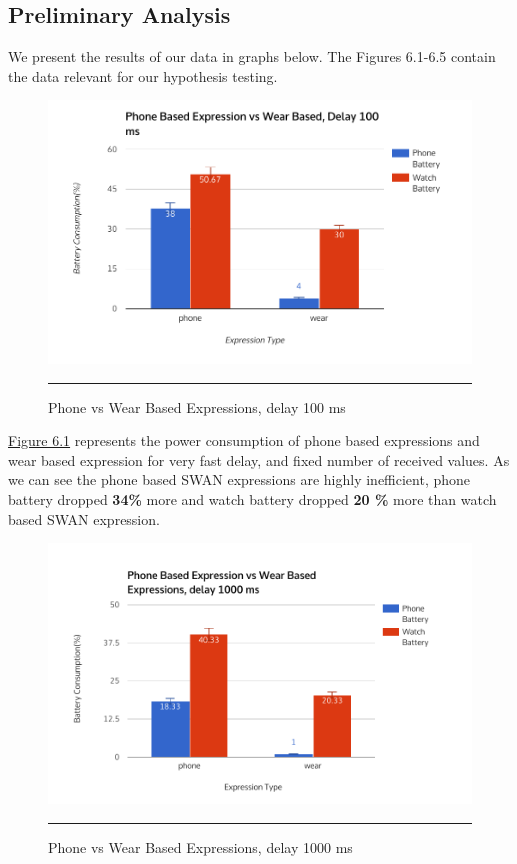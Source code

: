 \subsection{Preliminary Analysis}

We present the results of our data in graphs below.
The Figures 6.1-6.5 contain the data relevant for our hypothesis testing.
 
 \begin{figure}[htbp]
  \centering
    \includegraphics[scale=0.8]{Figures/phone_vs_wear_100.pdf}
    \rule{35em}{0.5pt}
  \caption[Phone vs Wear Based Expressions, delay 100 ms]{Phone vs Wear Based Expressions, delay 100 ms}
  \label{fig:phone_vs_wear_100}
\end{figure}

\hyperref[fig:phone_vs_wear_100]{Figure 6.1} represents the power consumption of phone based expressions and wear based expression for very fast delay,
and fixed number of received values. As we can see the phone based SWAN expressions are highly inefficient, phone battery dropped \textbf{34\%} more and watch battery dropped 
\textbf{20 \% } more than watch based SWAN expression. 

 \begin{figure}[htbp]
  \centering
    \includegraphics[scale=0.8]{Figures/phone_vs_wear_1000.pdf}
    \rule{35em}{0.5pt}
  \caption[Phone vs Wear Based  Expressions, delay 1000 ms]{Phone vs Wear Based  Expressions, delay 1000 ms}
  \label{fig:phone_vs_wear_1000}
\end{figure}

